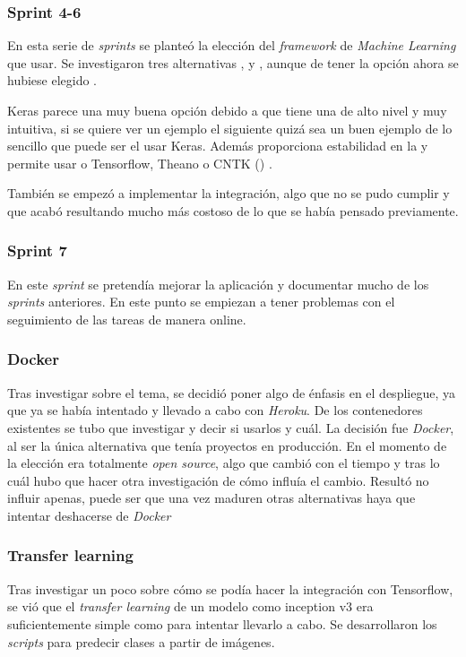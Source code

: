 \subsubsection{Sprint 4-6}
En esta serie de \emph{sprints} se planteó la elección del \emph{framework} de \emph{Machine Learning}  que usar. Se investigaron tres alternativas ,  y , aunque de tener la opción ahora se hubiese elegido .

Keras parece una muy buena opción debido a que tiene una  de alto nivel y muy intuitiva, si se quiere ver un ejemplo el siguiente  quizá sea un buen ejemplo de lo sencillo que puede ser el usar Keras. Además proporciona estabilidad en la  y permite usar o Tensorflow, Theano o CNTK () .

También se empezó a implementar la integración, algo que no se pudo cumplir y que acabó resultando mucho más costoso de lo que se había pensado previamente.

\subsubsection{Sprint 7}
En este \emph{sprint} se pretendía mejorar la aplicación y documentar mucho de los \emph{sprints} anteriores.
En este punto se empiezan a tener problemas con el seguimiento de las tareas de manera online.

\subsubsection{Docker}
Tras investigar sobre el tema, se decidió poner algo de énfasis en el despliegue, ya que ya se había intentado y llevado a cabo con \emph{Heroku}. De los contenedores existentes se tubo que investigar y decir si usarlos y cuál. La decisión fue \emph{Docker}, al ser la única alternativa que tenía proyectos en producción. En el momento de la elección era totalmente \emph{open source}, algo que cambió con el tiempo y tras lo cuál hubo que hacer otra investigación de cómo influía el cambio. Resultó no influir apenas, puede ser que una vez maduren otras alternativas haya que intentar deshacerse de \emph{Docker}

\subsubsection{Transfer learning}
Tras investigar un poco sobre cómo se podía hacer la integración con Tensorflow, se vió que el \emph{transfer learning} de un modelo como inception v3 era suficientemente simple como para intentar llevarlo a cabo.
Se desarrollaron los \emph{scripts} para predecir clases a partir de imágenes.


